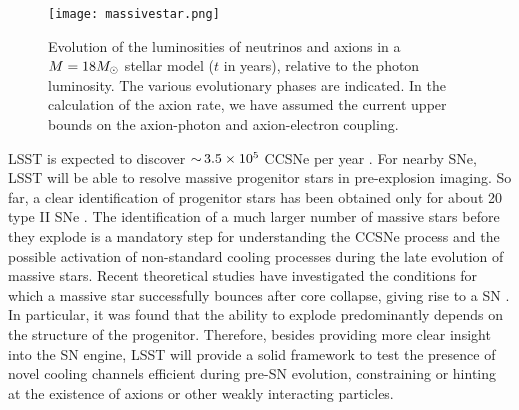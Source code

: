 \begin{figure}[t]
\centering
\texttt{[image: massivestar.png]}
\caption{Evolution of the luminosities of neutrinos and axions in a $M=18 M_\odot$ stellar model ($t$ in years), relative to the photon luminosity. The various evolutionary phases are indicated. 
In the calculation of the axion rate, we have assumed the current upper bounds on the axion-photon and axion-electron coupling.
}
\label{fig:massivestar}
\end{figure}

LSST is expected to discover $ {\sim}\, 3.5\times10^5$ CCSNe per year \citep{Lien:2009}. 
For nearby SNe, LSST will be able to resolve massive progenitor stars in pre-explosion imaging. 
So far, a clear identification of progenitor stars has been obtained only for about 20 type II SNe \citep{Smartt:2015}.  
The identification of a much larger number of massive stars before they explode is a mandatory step for understanding the CCSNe process and the possible activation of non-standard cooling processes during the late evolution of massive stars. 
Recent theoretical studies have investigated the conditions for which a massive star successfully bounces after core collapse, giving rise to a SN \citep[\eg,][and references therein]{OConnor:2011,Sukhbold:2016}.   
In particular, it was found that the ability to explode predominantly depends on the structure of the progenitor. 
Therefore, besides providing more clear insight into the SN engine, LSST will provide a solid framework to test the presence of novel cooling channels efficient during pre-SN evolution, constraining or hinting at the existence of axions or other weakly interacting particles.


